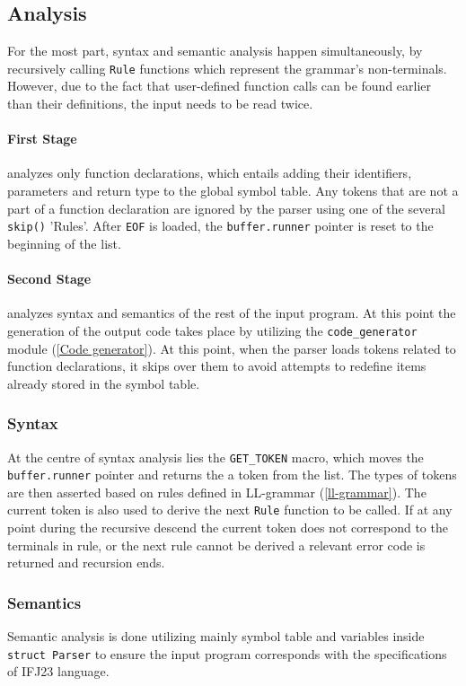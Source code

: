 \subsection{Analysis} 
\label{parser:analysis}
For the most part, syntax and semantic analysis happen simultaneously, by recursively calling \texttt{Rule} functions which represent the grammar's non-terminals. However, due to the fact that user-defined function calls can be found earlier than their definitions, the input needs to be read twice.

\paragraph{First Stage}
\label{parser:analysis:stage1}
 analyzes only function declarations, which entails adding their identifiers, parameters and return type to the global symbol table. Any tokens that are not a part of a function declaration are ignored by the parser using one of the several \texttt{skip()} 'Rules'. After \texttt{EOF} is loaded, the \texttt{buffer.runner} pointer is reset to the beginning of the list. 

\paragraph{Second Stage} 
\label{parser:analysis:stage2}
analyzes syntax and semantics of the rest of the input program. At this point the generation of the output code takes place by utilizing the \texttt{code\_generator} module (\ref{Code generator}). At this point, when the parser loads tokens related to function declarations, it skips over them to avoid attempts to redefine items already stored in the symbol table.

\subsubsection{Syntax}
\label{parser:analysis:syntax}
At the centre of syntax analysis lies the \texttt{GET\_TOKEN} macro, which moves the \texttt{buffer.runner} pointer and returns the a token from the list. The types of tokens are then asserted based on rules defined in LL-grammar (\ref{ll-grammar}). The current token is also used to derive the next \texttt{Rule} function to be called. If at any point during the recursive descend the current token does not correspond to the terminals in rule, or the next rule cannot be derived a relevant error code is returned and recursion ends. 

\subsubsection{Semantics}
\label{parser:analysis:semantics}
Semantic analysis is done utilizing mainly symbol table and variables inside \texttt{struct Parser} to ensure the input program corresponds with the specifications of IFJ23 language. 


